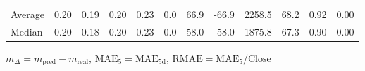 \begin{threeparttable}
{\begin{tabular}{lrrrrrrrrrrr}
Average &          0.20 &          0.19 &          0.20 &        0.23 &                 0.0 &                66.9 &      -66.9 &              2258.5 &             68.2 &            0.92 &                   0.00 \\
 Median &          0.20 &          0.18 &          0.20 &        0.23 &                 0.0 &                58.0 &      -58.0 &              1875.8 &             67.3 &            0.90 &                   0.00 \\
\bottomrule
\end{tabular}
}
\begin{tablenotes}\footnotesize
\item $m_\Delta=m_{\text{pred}}-m_{\text{real}}$,
$\mathrm{MAE}_5=\mathrm{MAE}_{5\text{d}}$,
$\mathrm{RMAE}=\mathrm{MAE}_5/\text{Close}$
\end{tablenotes}
\end{threeparttable}
\endgroup

